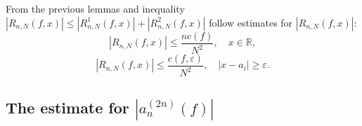 From the previous lemmas and inequality $\left|R_{n,N}(f,x)\right|\leq\left|R_{n,N}^{1}(f,x)\right|+\left|R_{n,N}^{2}(f,x)\right|$
follow estimates for $\left|R_{n,N}(f,x)\right|$:
\begin{equation}
\left|R_{n,N}(f,x)\right|\leq\frac{nc(f)}{N^2},\quad x\in\mathbb{R},\label{eq:R_est1}
\end{equation}
\begin{equation}
\left|R_{n,N}(f,x)\right|\leq\frac{c(f,\varepsilon)}{N^{2}},\quad\left|x-a_{i}\right|\geq\varepsilon.\label{eq:R_est2}
\end{equation}

\subsection{The estimate for $\left|a_{n}^{(2n)}(f)\right|$}

